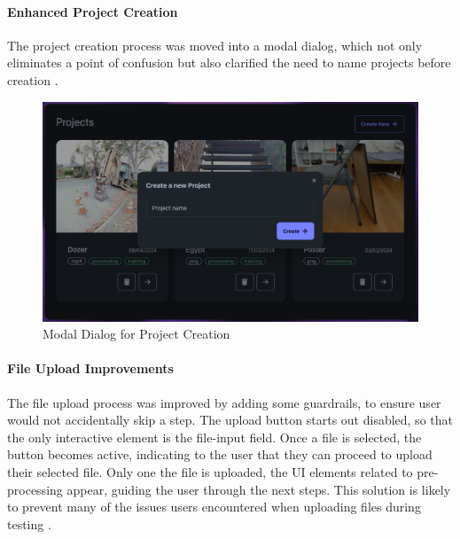 \paragraph{Enhanced Project Creation}
The project creation process was moved into a modal dialog, which not only eliminates a point of confusion but also clarified the need to name projects before creation .

\begin{figure}[htb]
  \centering
	\includegraphics[width=.7\textwidth]{figures/fix-3.png}
	\caption{Modal Dialog for Project Creation}
  \label{fig:fix-3}
\end{figure}

\paragraph{File Upload Improvements}
The file upload process was improved by adding some guardrails, to ensure user would not accidentally skip a step.
The upload button starts out disabled, so that the only interactive element is the file-input field.
Once a file is selected, the button becomes active, indicating to the user that they can proceed to upload their selected file.
Only one the file is uploaded, the UI elements related to pre-processing appear, guiding the user through the next steps.
This solution is likely to prevent many of the issues users encountered when uploading files during testing .


